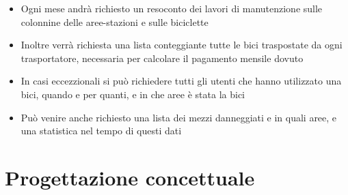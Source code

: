 \documentclass[a4paper,twoside]{article}
\begin{document}
\begin{itemize}
 \item Ogni mese andrà richiesto un resoconto dei lavori di manutenzione sulle colonnine delle aree-stazioni e sulle biciclette
 \item Inoltre verrà richiesta una lista conteggiante tutte le bici traspostate da ogni trasportatore, necessaria per calcolare il pagamento mensile dovuto
 \item In casi eccezzionali si può richiedere tutti gli utenti che hanno utilizzato una bici, quando e per quanti, e in che aree è stata la bici
 \item Può venire anche richiesto una lista dei mezzi danneggiati e in quali aree, e una statistica nel tempo di questi dati
\end{itemize}

\section{Progettazione concettuale}

\end{document}
